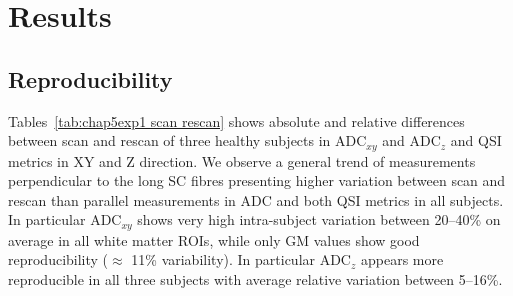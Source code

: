 \section{Results}
\subsection{Reproducibility}
\label{par:chapter5 exp1 reproducibility}
Tables~\ref{tab:chap5exp1 scan rescan} shows absolute and relative differences between scan and rescan of three healthy subjects in ADC$_{xy}$ and ADC$_z$ and \gls{QSI} metrics in XY and Z direction. We observe a general trend of measurements perpendicular to the long \gls{SC} fibres presenting higher variation between scan and rescan than parallel measurements in \gls{ADC} and both \gls{QSI} metrics in all subjects. In particular ADC$_{xy}$ shows very high intra-subject variation between 20--40\% on average in all white matter \glspl{ROI}, while only GM values show good reproducibility ($\approx$ 11\% variability). In particular ADC$_z$ appears more reproducible in all three subjects with average relative variation between 5--16\%.


